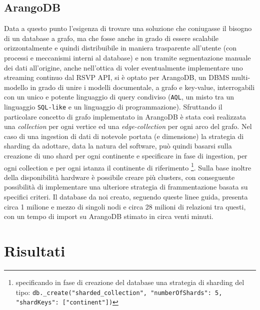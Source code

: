 \documentclass[fleqn,10pt]{SelfArx} %
\begin{document}
{\subsection{ArangoDB}
Data a questo punto l'esigenza di trovare una soluzione che coniugasse il bisogno di un database a grafo, ma che fosse anche in grado di essere scalabile orizzontalmente e quindi distribuibile in maniera trasparente all'utente (con processi e meccanismi interni al database) e non tramite segmentazione manuale dei dati all'origine, anche nell'ottica di voler eventualmente implementare uno streaming continuo dal RSVP API, si è optato per ArangoDB, un DBMS multi-modello in grado di unire i modelli documentale, a grafo e key-value, interrogabili con un unico e potente linguaggio di query condiviso (\texttt{AQL}, un misto tra un linguaggio \texttt{SQL-like} e un linguaggio di programmazione).
Sfruttando il particolare concetto di grafo implementato in ArangoDB è stata così realizzata una \textit{collection} per ogni vertice ed una \textit{edge-collection} per ogni arco del grafo. 
Nel caso di una ingestion di dati di notevole portata (e dimensione) la strategia di sharding da adottare, data la natura del software, può quindi basarsi sulla creazione di uno shard per ogni continente e specificare in fase di ingestion, per ogni collection e per ogni istanza il continente di riferimento \footnote{specificando in fase di creazione del database una strategia di sharding del tipo: \texttt{db.\_create("sharded\_collection", {"numberOfShards": 5, "shardKeys": ["continent"]})}}. 
Sulla base inoltre della disponibilità hardware è possibile creare più clusters, con conseguente possibilità di implementare una ulteriore strategia di frammentazione basata su specifici criteri.
Il database da noi creato, seguendo queste linee guida, presenta circa 1 milione e mezzo di singoli nodi e circa 28 milioni di relazioni tra questi, con un tempo di import su ArangoDB stimato in circa venti minuti.

\section{Risultati}
}
\end{document}
